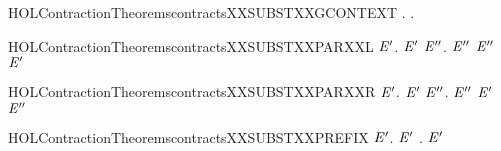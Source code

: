 \newcommand{\HOLContractionTheoremscontractsXXrules}{\UseVerbatim{HOLContractionTheoremscontractsXXrules}}
\begin{SaveVerbatim}{HOLContractionTheoremscontractsXXSUBSTXXGCONTEXT}
\HOLTokenTurnstile{} \HOLSymConst{\HOLTokenForall{}} .    \HOLSymConst{\HOLTokenImp{}} \HOLSymConst{\HOLTokenForall{}}.   \HOLSymConst{\HOLTokenImp{}}     
\end{SaveVerbatim}
\newcommand{\HOLContractionTheoremscontractsXXSUBSTXXGCONTEXT}{\UseVerbatim{HOLContractionTheoremscontractsXXSUBSTXXGCONTEXT}}
\begin{SaveVerbatim}{HOLContractionTheoremscontractsXXSUBSTXXPARXXL}
\HOLTokenTurnstile{} \HOLSymConst{\HOLTokenForall{}} \ensuremath{\HOLBoundVar{E}\sp{\prime}}.   \ensuremath{\HOLBoundVar{E}\sp{\prime}} \HOLSymConst{\HOLTokenImp{}} \HOLSymConst{\HOLTokenForall{}}\ensuremath{\HOLBoundVar{E}\sp{\prime\prime}}. \ensuremath{\HOLBoundVar{E}\sp{\prime\prime}} \HOLSymConst{\ensuremath{\mid}}   \ensuremath{\HOLBoundVar{E}\sp{\prime\prime}} \HOLSymConst{\ensuremath{\mid}} \ensuremath{\HOLBoundVar{E}\sp{\prime}}
\end{SaveVerbatim}
\newcommand{\HOLContractionTheoremscontractsXXSUBSTXXPARXXL}{\UseVerbatim{HOLContractionTheoremscontractsXXSUBSTXXPARXXL}}
\begin{SaveVerbatim}{HOLContractionTheoremscontractsXXSUBSTXXPARXXR}
\HOLTokenTurnstile{} \HOLSymConst{\HOLTokenForall{}} \ensuremath{\HOLBoundVar{E}\sp{\prime}}.   \ensuremath{\HOLBoundVar{E}\sp{\prime}} \HOLSymConst{\HOLTokenImp{}} \HOLSymConst{\HOLTokenForall{}}\ensuremath{\HOLBoundVar{E}\sp{\prime\prime}}.  \HOLSymConst{\ensuremath{\mid}} \ensuremath{\HOLBoundVar{E}\sp{\prime\prime}}  \ensuremath{\HOLBoundVar{E}\sp{\prime}} \HOLSymConst{\ensuremath{\mid}} \ensuremath{\HOLBoundVar{E}\sp{\prime\prime}}
\end{SaveVerbatim}
\newcommand{\HOLContractionTheoremscontractsXXSUBSTXXPARXXR}{\UseVerbatim{HOLContractionTheoremscontractsXXSUBSTXXPARXXR}}
\begin{SaveVerbatim}{HOLContractionTheoremscontractsXXSUBSTXXPREFIX}
\HOLTokenTurnstile{} \HOLSymConst{\HOLTokenForall{}} \ensuremath{\HOLBoundVar{E}\sp{\prime}}.   \ensuremath{\HOLBoundVar{E}\sp{\prime}} \HOLSymConst{\HOLTokenImp{}} \HOLSymConst{\HOLTokenForall{}}. \HOLSymConst{\ensuremath{\ldotp}}  \HOLSymConst{\ensuremath{\ldotp}}\ensuremath{\HOLBoundVar{E}\sp{\prime}}
\end{SaveVerbatim}
